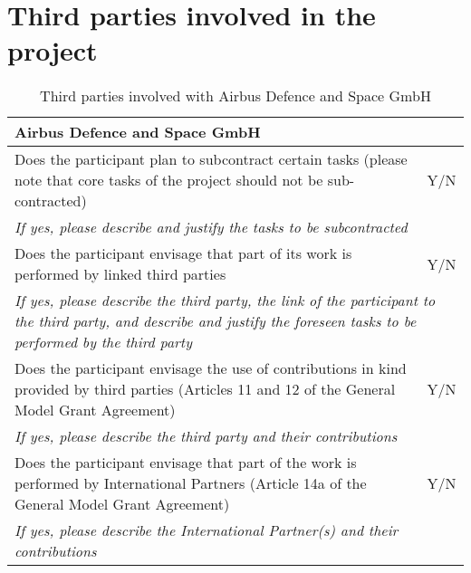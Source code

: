 \section{Third parties involved in the project}

\begin{table}[H]
	\centering
	\begin{tabular}{|p{10cm}|p{4cm}|}
		\hline
		
		\multicolumn{2}{|p{14cm}|}{\textbf{Airbus Defence and Space GmbH}}\\
		
		\hline
		
		Does the participant plan to subcontract certain tasks (please note that core tasks of the project should not be sub-contracted) & Y/N\\
		
		\hline
		
		\multicolumn{2}{|p{14cm}|}{\textit{If yes, please describe and justify the tasks to be subcontracted}}\\
		
		\hline
		
		Does the participant envisage that part of its work is performed by linked third parties & Y/N\\
		
		\hline
		
		\multicolumn{2}{|p{14cm}|}{\textit{If yes, please describe the third party, the link of the participant to the third party, and describe and justify the foreseen tasks to be performed by the third party}}\\
		
		\hline
		
		Does the participant envisage the use of contributions in kind provided by third parties (Articles 11 and 12 of the General Model Grant Agreement) & Y/N\\
		
		\hline
		
		\multicolumn{2}{|p{14cm}|}{\textit{If yes, please describe the third party and their contributions}}\\
		
		\hline
		
		Does the participant envisage that part of the work is performed by International Partners (Article 14a of the General Model Grant Agreement) & Y/N\\
		
		\hline
		
		\multicolumn{2}{|p{14cm}|}{\textit{If yes, please describe the International Partner(s) and their contributions}}\\
		
		\hline
	\end{tabular}
	\caption{Third parties involved with Airbus Defence and Space GmbH}
\end{table}



